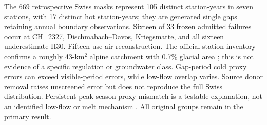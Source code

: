 The 669 retrospective Swiss masks represent 105 distinct station-years in seven stations, with 17 distinct hot station-years; they are generated single gaps retaining annual boundary observations. Sixteen of 33 frozen admitted failures occur at CH\_2327, Dischmabach--Davos, Kriegsmatte, and all sixteen underestimate H30. Fifteen use air reconstruction. The official station inventory confirms a roughly 43-km$^2$ alpine catchment with 0.7\% glacial area \cite{foen2327}; this is not evidence of a specific regulation or groundwater class. Gap-period cold proxy errors can exceed visible-period errors, while low-flow overlap varies. Source donor removal raises unscreened error but does not reproduce the full Swiss distribution. Persistent peak-season proxy mismatch is a testable explanation, not an identified low-flow or melt mechanism \cite{michel2020}. All original groups remain in the primary result.

